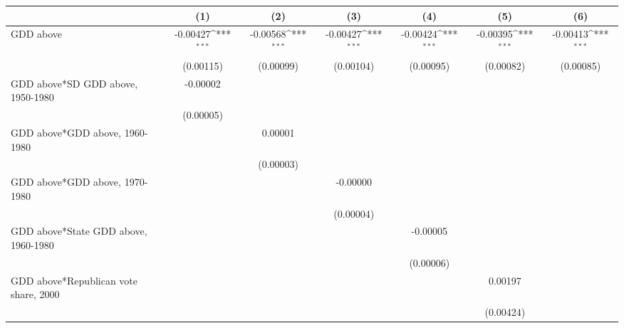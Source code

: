 {
\def\sym#1{\ifmmode^{#1}\else\(^{#1}\)\fi}
\begin{tabular*}{\hsize}{@{\hskip\tabcolsep\extracolsep\fill}l*{6}{c}}
\hline\hline
                &\multicolumn{1}{c}{(1)}         &\multicolumn{1}{c}{(2)}         &\multicolumn{1}{c}{(3)}         &\multicolumn{1}{c}{(4)}         &\multicolumn{1}{c}{(5)}         &\multicolumn{1}{c}{(6)}         \\
\hline
GDD above       & -0.00427\sym{***}& -0.00568\sym{***}& -0.00427\sym{***}& -0.00424\sym{***}& -0.00395\sym{***}& -0.00413\sym{***}\\
                &(0.00115)         &(0.00099)         &(0.00104)         &(0.00095)         &(0.00082)         &(0.00085)         \\
[1em]
GDD above*SD GDD above, 1950-1980& -0.00002         &                  &                  &                  &                  &                  \\
                &(0.00005)         &                  &                  &                  &                  &                  \\
[1em]
GDD above*GDD above, 1960-1980&                  &  0.00001         &                  &                  &                  &                  \\
                &                  &(0.00003)         &                  &                  &                  &                  \\
[1em]
GDD above*GDD above, 1970-1980&                  &                  & -0.00000         &                  &                  &                  \\
                &                  &                  &(0.00004)         &                  &                  &                  \\
[1em]
GDD above*State GDD above, 1960-1980&                  &                  &                  & -0.00005         &                  &                  \\
                &                  &                  &                  &(0.00006)         &                  &                  \\
[1em]
GDD above*Republican vote share, 2000&                  &                  &                  &                  &  0.00197         &                  \\
                &                  &                  &                  &                  &(0.00424)         &                  \\

\end{tabular*}}
